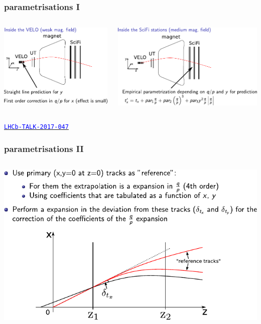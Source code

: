 \documentclass[table,xcolor=dvipsnames,professionalfonts]{beamer}
\newcommand{\myhref}[2]{\href{#1}{\footnotesize{\textcolor{blue}{\texttt{#2}}}}}
\begin{document}
\begin{frame}
  \frametitle{parametrisations I}
  \begin{columns}\begin{column}{.5\textwidth}
      \includegraphics[width=\textwidth]{./paravelo.pdf}
  \end{column}\begin{column}{.5\textwidth}
      \includegraphics[width=\textwidth]{./paratstat.pdf}
  \end{column}\end{columns}
  \myhref{https://cds.cern.ch/record/2255840}{LHCb-TALK-2017-047}
\end{frame}\begin{frame}
  \frametitle{parametrisations II}
  \begin{columns}\begin{column}{.7\textwidth}
      \includegraphics[width=\textwidth]{./deltatx.pdf}

\end{column}
\end{columns}
\end{frame}
\end{document}
